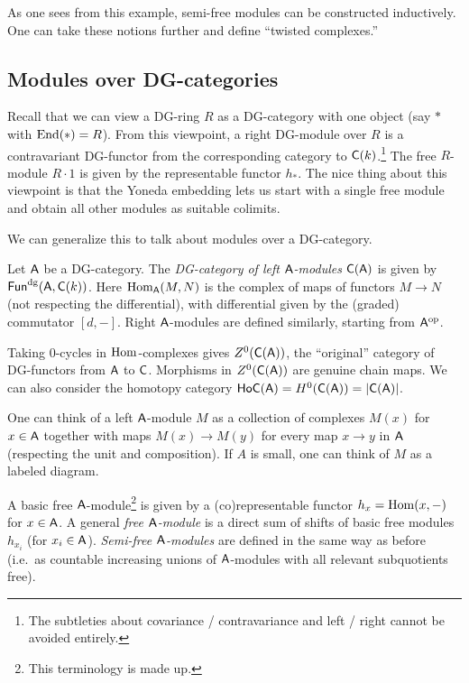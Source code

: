 \documentclass{amsart}
\begin{document}
As one sees from this example, semi-free modules can be constructed inductively.
One can take these notions further and define ``twisted complexes.''

\subsection{Modules over DG-categories}

Recall that we can view a DG-ring $R$ as a DG-category with one object (say $*$ with $\operatorname{End}(*) = R$).
From this viewpoint, a right DG-module over $R$ is a contravariant DG-functor from the corresponding category to $\mathsf{C}(k)$.\footnote{The subtleties about covariance / contravariance and left / right cannot be avoided entirely.}
The free $R$-module $R \cdot 1$ is given by the representable functor $h_*$. 
The nice thing about this viewpoint is that the Yoneda embedding lets us start with a single free module and obtain all other modules as suitable colimits.

We can generalize this to talk about modules over a DG-category.

\begin{dfn}
	Let $\mathsf{A}$ be a DG-category.
	The \emph{DG-category of left $\mathsf{A}$-modules} $\mathsf{C}(\mathsf{A})$ is given by $\mathsf{Fun}^{\mathrm{dg}}(\mathsf{A}, \mathsf{C}(k))$.
	Here $\operatorname{Hom}_{\mathsf{A}}(M, N)$ is the complex of maps of functors $M \to N$ (not respecting the differential), with differential given by the (graded) commutator $[d, -]$.
	Right $\mathsf{A}$-modules are defined similarly, starting from $\mathsf{A}^{\mathrm{op}}$.

	Taking $0$-cycles in $\operatorname{Hom}$-complexes gives $Z^0(\mathsf{C}(\mathsf{A}))$, the ``original'' category of DG-functors from $\mathsf{A}$ to $\mathsf{C}$.
	Morphisms in $Z^0(\mathsf{C}(\mathsf{A}))$ are genuine chain maps.
	We can also consider the homotopy category $\mathsf{Ho} \mathsf{C}(\mathsf{A}) = H^0(\mathsf{C}(\mathsf{A})) = |\mathsf{C}(\mathsf{A})|$.
\end{dfn}

One can think of a left $\mathsf{A}$-module $M$ as a collection of complexes $M(x)$ for $x \in \mathsf{A}$ together with maps $M(x) \to M(y)$ for every map $x \to y$ in $\mathsf{A}$ (respecting the unit and composition).
If $A$ is small, one can think of $M$ as a labeled diagram.

\begin{dfn}
	A basic free $\mathsf{A}$-module\footnote{This terminology is made up.} is given by a (co)representable functor $h_x = \operatorname{Hom}(x, -)$ for $x \in \mathsf{A}$.
	A general \emph{free $\mathsf{A}$-module} is a direct sum of shifts of basic free modules $h_{x_i}$ (for $x_i \in \mathsf{A}$).
	\emph{Semi-free $\mathsf{A}$-modules} are defined in the same way as before (i.e.\ as countable increasing unions of $\mathsf{A}$-modules with all relevant subquotients free). 
\end{dfn}
\end{document}
